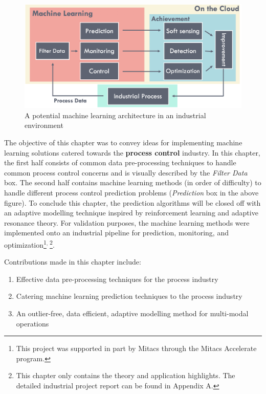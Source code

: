 \begin{figure}[h]
    \centering
    \includegraphics[width=\textwidth]{images/ch2/02AICloud.png}
    \caption{A potential machine learning architecture in an industrial environment}
    \label{fig:02AICloud}
\end{figure}

The objective of this chapter was to convey ideas for implementing machine learning solutions catered towards the \textbf{process control} industry.  In this chapter, the first half consists of common data pre-processing techniques to handle common process control concerns and is visually described by the \textit{Filter Data} box.  The second half contains machine learning methods (in order of difficulty) to handle different process control prediction problems (\textit{Prediction} box in the above figure). To conclude this chapter, the prediction algorithms will be closed off with an adaptive modelling technique inspired by reinforcement learning and adaptive resonance theory. For validation purposes, the machine learning methods were implemented onto an industrial pipeline for prediction, monitoring, and optimization\footnote{This project was supported in part by Mitacs through the Mitacs Accelerate program.}$^{, \;}$\footnote{This chapter only contains the theory and application highlights. The detailed industrial project report can be found in Appendix A.}.

Contributions made in this chapter include:
\begin{enumerate}
    \item Effective data pre-processing techniques for the process industry
    \item Catering machine learning prediction techniques to the process industry
    \item An outlier-free, data efficient, adaptive modelling method for multi-modal operations
\end{enumerate}

